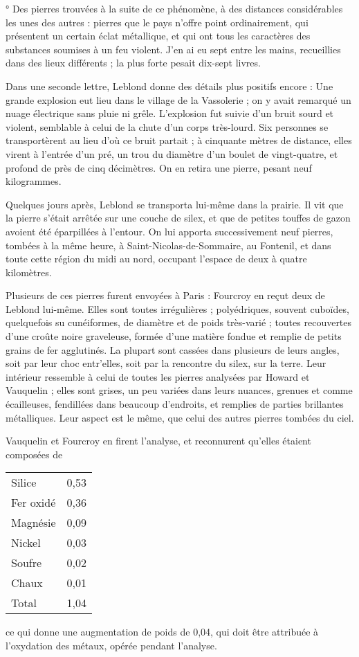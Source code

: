 \documentclass[a4paper, 12pt, oneside, french]{article}
\begin{document}
° Des pierres trouvées à la suite de ce phénomène, à des distances considérables les unes des autres : pierres que le pays n'offre point ordinairement, qui présentent un certain éclat métallique, et qui ont tous les caractères des substances soumises à un feu violent. J'en ai eu sept entre les mains, recueillies dans des lieux différents ; la plus forte pesait dix-sept livres. \fg

Dans une seconde lettre, Leblond donne des détails plus positifs encore : \og Une grande explosion eut lieu dans le village de la Vassolerie ; on y avait remarqué un nuage électrique sans pluie ni grêle. L'explosion fut suivie d'un bruit sourd et violent, semblable à celui de la chute d'un corps très-lourd. Six personnes se transportèrent au lieu d'où ce bruit partait ; à cinquante mètres de distance, elles virent à l'entrée d'un pré, un trou du diamètre d'un boulet de vingt-quatre, et profond de près de cinq décimètres. On en retira une pierre, pesant neuf kilogrammes. \fg

Quelques jours après, Leblond se transporta lui-même dans la prairie. Il vit que la pierre s'était arrêtée sur une couche de silex, et que de petites touffes de gazon avoient été éparpillées à l'entour. On lui apporta successivement neuf pierres, tombées à la même heure, à Saint-Nicolas-de-Sommaire, au Fontenil, et dans toute cette région du midi au nord, occupant l'espace de deux à quatre kilomètres.

Plusieurs de ces pierres furent envoyées à Paris : Fourcroy en reçut deux de Leblond lui-même. Elles sont toutes irrégulières ; polyédriques, souvent cuboïdes, quelquefois su cunéiformes, de diamètre et de poids très-varié ; toutes recouvertes d'une croûte noire graveleuse, formée d'une matière fondue et remplie de petits grains de fer agglutinés. La plupart sont cassées dans plusieurs de leurs angles, soit par leur choc entr'elles, soit par la rencontre du silex, sur la terre. Leur intérieur ressemble à celui de toutes les pierres analysées par Howard et Vauquelin ; elles sont grises, un peu variées dans leurs nuances, grenues et comme écailleuses, fendillées dans beaucoup d'endroits, et remplies de parties brillantes métalliques. Leur aspect est le même, que celui des autres pierres tombées du ciel.

Vauquelin et Fourcroy en firent l'analyse, et reconnurent qu'elles étaient composées de
\begin{table}[H]
    \centering
    \begin{tabular}{l r}
        Silice & 0,53 \\
        Fer oxidé & 0,36 \\
        Magnésie & 0,09 \\
        Nickel & 0,03 \\
        Soufre & 0,02 \\
        Chaux & 0,01 \\ \hline
        Total & 1,04 \\
    \end{tabular}
\end{table}
ce qui donne une augmentation de poids de 0,04, qui doit être attribuée à l'oxydation des métaux, opérée pendant l'analyse.
\end{document}
